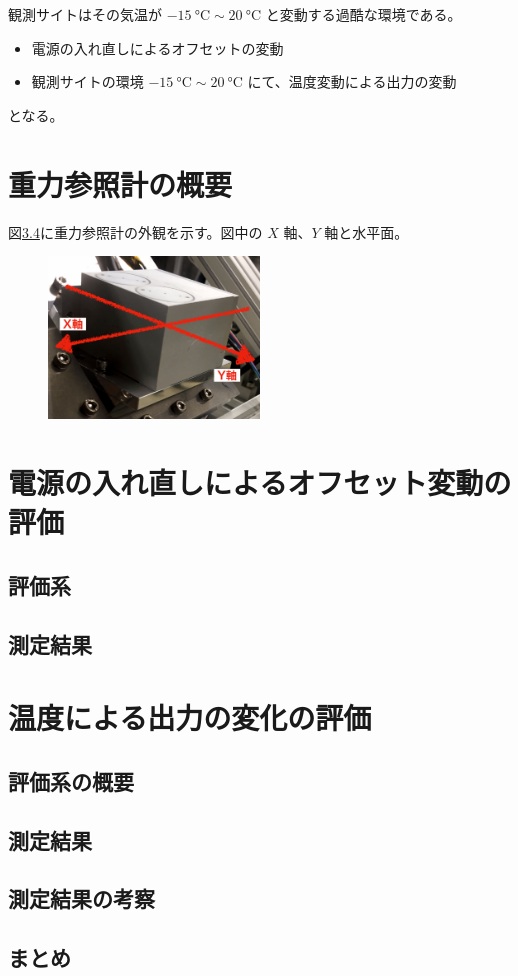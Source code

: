 \documentclass[../../main.tex]{subfiles}
\begin{document}
観測サイトはその気温が $\SI{-15}{\degreeCelsius} \sim \SI{20}{\degreeCelsius}$ と変動する過酷な環境である。
\begin{itemize}
    \item 電源の入れ直しによるオフセットの変動
    \item 観測サイトの環境 $\SI{-15}{\degreeCelsius} \sim \SI{20}{\degreeCelsius}$ にて、温度変動による出力の変動
\end{itemize}
となる。

\section{重力参照計の概要}
図\ref{}に重力参照計の外観を示す。図中の $X$ 軸、$Y$ 軸と水平面。
\begin{figure}
    \centering
    \includegraphics[width=0.5\textwidth]{tiltsensor/tiltsensor_overview.pdf}
    \label{fig:tiltsensor_DSIC-2051-60}
\end{figure}
\section{電源の入れ直しによるオフセット変動の評価}
\subsection{評価系}
\subsection{測定結果}
\section{温度による出力の変化の評価}
\subsection{評価系の概要}
\subsection{測定結果}
\subsection{測定結果の考察}
\subsection{まとめ}
\end{document}
